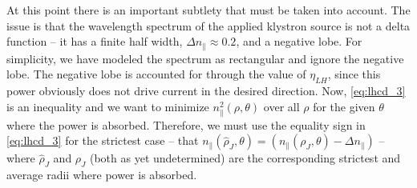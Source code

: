 At this point there is an important subtlety that must be taken into account. The issue is that the wavelength spectrum of the applied klystron source is not a delta function -- it has a finite half width, $\Delta n _ { \| } \approx 0.2$, and a negative lobe. For simplicity, we have modeled the spectrum as rectangular and ignore the negative lobe. The negative lobe is accounted for through the value of $\eta_{LH}$, since this power obviously does not drive current in the desired direction. Now, \cref{eq:lhcd_3} is an inequality and we want to minimize $n_\parallel^2 (\rho,\theta)$ over all $\rho$ for the given $\theta$ where the power is absorbed. Therefore, we must use the equality sign in \cref{eq:lhcd_3} for the strictest case -- that $n _ { \| } \left( \hat { \rho } _ { J } , \theta \right) = \left( n _ { \| } \left( \rho _ { J } , \theta \right) - \Delta n _ { \| } \right) $ -- where $\hat \rho_J$ and $\rho_J$ (both as yet undetermined) are the corresponding strictest and average radii where power is absorbed.

